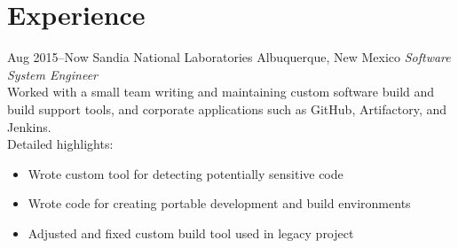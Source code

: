\documentclass[]{friggeri-cv} %
\begin{document}

\section{Experience}

\begin{entrylist}
\entry
{Aug 2015--Now}
{Sandia National Laboratories}
{Albuquerque, New Mexico}
{\emph{Software System Engineer}} \\
Worked with a small team writing and maintaining custom software build and build support tools, and corporate applications such as GitHub, Artifactory, and Jenkins.\\
Detailed highlights:
\begin{itemize}
\item Wrote custom tool for detecting potentially sensitive code 
\item Wrote code for creating portable development and build environments
\item Adjusted and fixed custom build tool used in legacy project
\end{itemize}


\end{entrylist}
\end{document}
